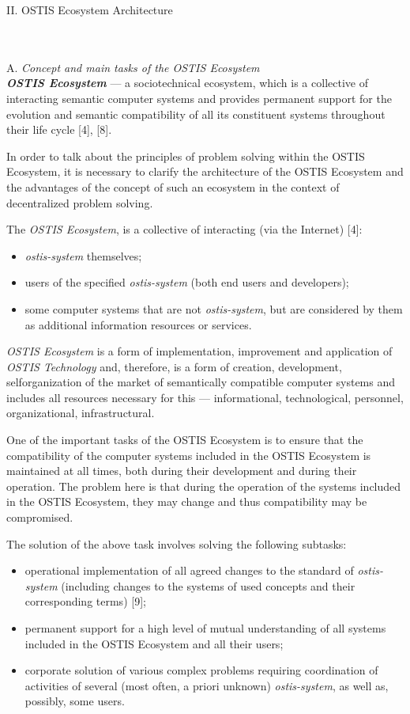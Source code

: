 \documentclass[a4paper,10pt]{article}
\begin{document}
\begin{multicols}{2}
\begin{center}
    II. OSTIS Ecosystem Architecture
\end{center}
 \\ \\
A. \textit{Concept and main tasks of the OSTIS Ecosystem} \\ 


\textbf{\textit{OSTIS Ecosystem}} — a sociotechnical ecosystem,
which is a collective of interacting semantic computer
systems and provides permanent support for the evolution
and semantic compatibility of all its constituent systems
throughout their life cycle [4], [8].


In order to talk about the principles of problem solving
within the OSTIS Ecosystem, it is necessary to clarify the
architecture of the OSTIS Ecosystem and the advantages
of the concept of such an ecosystem in the context of
decentralized problem solving. 

The \textit{OSTIS Ecosystem}, is a collective of interacting
(via the Internet) [4]: 
\begin{itemize}
    \item \textit{ostis-system} themselves;
    \item users of the specified \textit{ostis-system} (both end users
and developers);
    \item some computer systems that are not \textit{ostis-system},
but are considered by them as additional information
resources or services.
\end{itemize}

\textit{OSTIS Ecosystem} is a form of implementation, improvement and application of \textit{OSTIS Technology} and,
therefore, is a form of creation, development, selforganization of the market of semantically compatible
computer systems and includes all resources necessary
for this — informational, technological, personnel, organizational, infrastructural. 


One of the important tasks of the OSTIS Ecosystem is
to ensure that the compatibility of the computer systems
included in the OSTIS Ecosystem is maintained at all
times, both during their development and during their
operation. The problem here is that during the operation
of the systems included in the OSTIS Ecosystem, they
may change and thus compatibility may be compromised. 


The solution of the above task involves solving the
following subtasks: 

\begin{itemize}
    \item operational implementation of all agreed changes to
the standard of \textit{ostis-system} (including changes to
the systems of used concepts and their corresponding terms) [9];
    \item permanent support for a high level of mutual understanding of all systems included in the OSTIS
Ecosystem and all their users; 
   \item corporate solution of various complex problems
requiring coordination of activities of several (most
often, a priori unknown) \textit{ostis-system}, as well as,
possibly, some users. 
\end{itemize}



\end{multicols}
\end{document}
